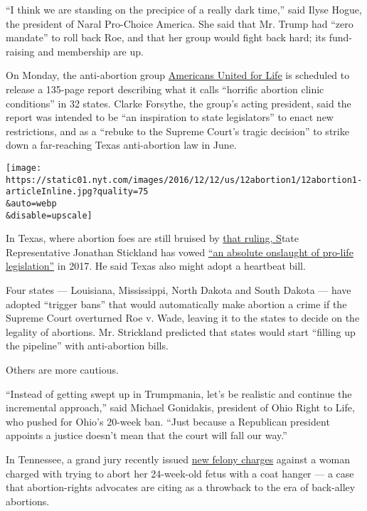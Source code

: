 ``I think we are standing on the precipice of a really dark time,'' said
Ilyse Hogue, the president of Naral Pro-Choice America. She said that
Mr. Trump had ``zero mandate'' to roll back Roe, and that her group
would fight back hard; its fund-raising and membership are up.

On Monday, the anti-abortion group \href{http://www.aul.org/}{Americans
United for Life} is scheduled to release a 135-page report describing
what it calls ``horrific abortion clinic conditions'' in 32 states.
Clarke Forsythe, the group's acting president, said the report was
intended to be ``an inspiration to state legislators'' to enact new
restrictions, and as a ``rebuke to the Supreme Court's tragic decision''
to strike down a far-reaching Texas anti-abortion law in June.

\texttt{[image: https://static01.nyt.com/images/2016/12/12/us/12abortion1/12abortion1-articleInline.jpg?quality=75\\\&auto=webp\\\&disable=upscale]}

In Texas, where abortion foes are still bruised by
\href{https://www.nytimes.com/2016/06/28/us/supreme-court-texas-abortion.html}{that
ruling, S}tate Representative Jonathan Stickland has vowed
\href{https://www.texastribune.org/2016/06/27/whats-next-texas-abortion-restrictions/}{``an
absolute onslaught of pro-life legislation''} in 2017. He said Texas
also might adopt a heartbeat bill.

Four states --- Louisiana, Mississippi, North Dakota and South Dakota
--- have adopted ``trigger bans'' that would automatically make abortion
a crime if the Supreme Court overturned Roe v. Wade, leaving it to the
states to decide on the legality of abortions. Mr. Strickland predicted
that states would start ``filling up the pipeline'' with anti-abortion
bills.

Others are more cautious.

``Instead of getting swept up in Trumpmania, let's be realistic and
continue the incremental approach,'' said Michael Gonidakis, president
of Ohio Right to Life, who pushed for Ohio's 20-week ban. ``Just because
a Republican president appoints a justice doesn't mean that the court
will fall our way.''

In Tennessee, a grand jury recently issued
\href{http://www.nytimes.com/2016/11/29/us/tennessee-woman-accused-of-coat-hanger-abortion-faces-new-charges.html}{new
felony charges} against a woman charged with trying to abort her
24-week-old fetus with a coat hanger --- a case that abortion-rights
advocates are citing as a throwback to the era of back-alley abortions.

